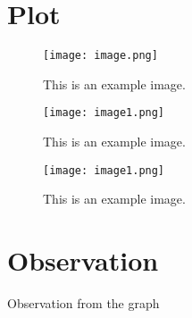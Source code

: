 \documentclass[12pt,a4paper]{article}
\begin{document}
\section{Plot}\label{sec:Plot}
\begin{figure}
    \centering
    \texttt{[image: image.png]}
    \caption{This is an example image.}
    \label{fig:example}
\end{figure}
\begin{figure}
    \centering
    \texttt{[image: image1.png]}
    \caption{This is an example image.}
    \label{fig:example}
\end{figure}
\begin{figure}
    \centering
    \texttt{[image: image1.png]}
    \caption{This is an example image.}
    \label{fig:example}
\end{figure}

\section{Observation}\label{sec:fObservation}
Observation from the graph
\end{document}
